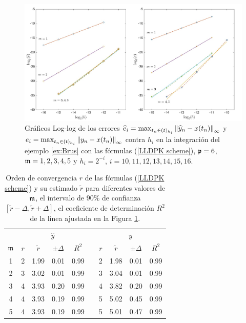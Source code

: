 \begin{figure}[htb]
	\begin{center}
		\includegraphics[scale=0.45]{Graphics/lldp/m-plots.jpg}
		\caption{Gráficos Log-log de los errores $\widehat{e}_i=\max_{t_n\in(t)_{h_i}}\left\lVert \widehat{y}_n-x(t_n) \right\rVert_\infty$ y $e_i=\max_{t_n\in(t)_{h_i}}\left\lVert y_n-x(t_n) \right\rVert_\infty$ contra $h_i$ en la integración del ejemplo \ref{ex:Brus} con las fórmulas (\ref{LLDPK scheme}), $\mathfrak{p}=6$, $\mathfrak{m}=1,2,3,4,5$ y $h_i=2^{-i}$, $i=10,11,12,13,14,15,16$.}
		\label{fig:num-exp-lldp-fix-step:Fig3}
	\end{center}
\end{figure}

\begin{table}[htb]
	\centering
	\caption{
        Orden de convergencia $r$ de las fórmulas (\ref{LLDPK scheme}) y su estimado  $\widetilde{r}$ para diferentes valores de $\mathfrak{m}$, el intervalo de $90\%$ de confianza $[\widetilde{r}-\varDelta,\widetilde{r}+\varDelta]$, el coeficiente de determinación $R^2$ de la línea ajustada en la Figura \ref{fig:num-exp-lldp-fix-step:Fig3}.}
		\begin{tabular}{ c  c c c c  c  c c c c}
			\hline
			& \multicolumn{4}{c}{$\widehat{y}$} & & \multicolumn{4}{c}{$y$} \\
			\cline{2-5} \cline{7-10}
			$\mathfrak{m}$ & $r$ & $\widetilde{r}$ & $\pm\varDelta$ & $R^2$ & & $r$ & $\widetilde{r}$ & $\pm\varDelta$ & $R^2$ \\
			\hline
			1 & 2 & 1.99 & 0.01 & 0.99 & & 2 & 1.98 & 0.01 & 0.99 \\
			2 & 3 & 3.02 & 0.01 & 0.99 & & 3 & 3.04 & 0.01 & 0.99 \\
			3 & 4 & 3.93 & 0.20 & 0.99 & & 4 & 3.82 & 0.20 & 0.99 \\
			4 & 4 & 3.93 & 0.19 & 0.99 & & 5 & 5.02 & 0.45 & 0.99 \\
			5 & 4 & 3.93 & 0.19 & 0.99 & & 5 & 5.01 & 0.47 & 0.99 \\
			\hline
		\end{tabular}
	\label{tab:num-exp-lldp-fix-step:morders}
\end{table}

